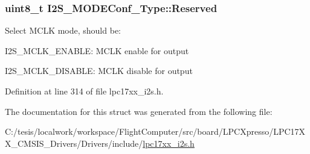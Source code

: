 \hypertarget{struct_i2_s___m_o_d_e_conf___type_abaab05449c36f69dce46351edf867d62}{
\subsubsection[{\-Reserved}]{\setlength{\rightskip}{0pt plus 5cm}uint8\-\_\-t {\bf \-I2\-S\-\_\-\-M\-O\-D\-E\-Conf\-\_\-\-Type\-::\-Reserved}}}\label{struct_i2_s___m_o_d_e_conf___type_abaab05449c36f69dce46351edf867d62}
\-Select \-M\-C\-L\-K mode, should be\-:
\begin{DoxyItemize}
\item \-I2\-S\-\_\-\-M\-C\-L\-K\-\_\-\-E\-N\-A\-B\-L\-E\-: \-M\-C\-L\-K enable for output
\item \-I2\-S\-\_\-\-M\-C\-L\-K\-\_\-\-D\-I\-S\-A\-B\-L\-E\-: \-M\-C\-L\-K disable for output 
\end{DoxyItemize}

\-Definition at line 314 of file lpc17xx\-\_\-i2s.\-h.



\-The documentation for this struct was generated from the following file\-:\begin{DoxyCompactItemize}
\item 
\-C\-:/tesis/localwork/workspace/\-Flight\-Computer/src/board/\-L\-P\-C\-Xpresso/\-L\-P\-C17\-X\-X\-\_\-\-C\-M\-S\-I\-S\-\_\-\-Drivers/\-Drivers/include/\hyperlink{lpc17xx__i2s_8h}{lpc17xx\-\_\-i2s.\-h}\end{DoxyCompactItemize}
